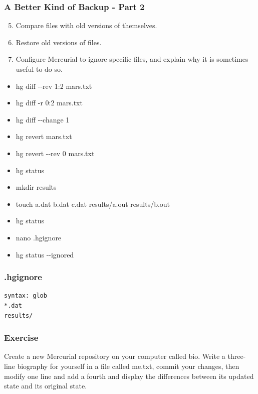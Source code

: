 \documentclass[xcolor=dvipsnames]{beamer}
\renewcommand{\dh}{{-}{-}}
\begin{document}

\begin{frame}[label=part2]
\frametitle{A Better Kind of Backup - Part 2}
\begin{enumerate}
\setcounter{enumi}{4}
\item Compare files with old versions of themselves.
\item Restore old versions of files.
\item Configure Mercurial to ignore specific files, and explain why it is sometimes useful to do so.
\end{enumerate}
\begin{multicols}{2}
\begin{itemize}
\item hg diff \dh rev 1:2 mars.txt
\item hg diff -r 0:2 mars.txt
\item hg diff \dh change 1
\item hg revert mars.txt
\item hg revert \dh rev 0 mars.txt
\item hg status
\item mkdir results
\item touch a.dat b.dat c.dat results/a.out results/b.out
\item hg status
\item nano .hgignore
\item hg status \dh ignored
\end{itemize}
\end{multicols}
\end{frame}

\begin{frame}[fragile]
\frametitle{.hgignore}
\begin{verbatim}
syntax: glob
*.dat
results/
\end{verbatim}
\end{frame}


\begin{frame}
\frametitle{Exercise}
Create a new Mercurial repository on your computer called bio. Write a three-line biography for yourself in a file called me.txt, commit your changes, then modify one line and add a fourth and display the differences between its updated state and its original state.
\end{frame}
\end{document}
